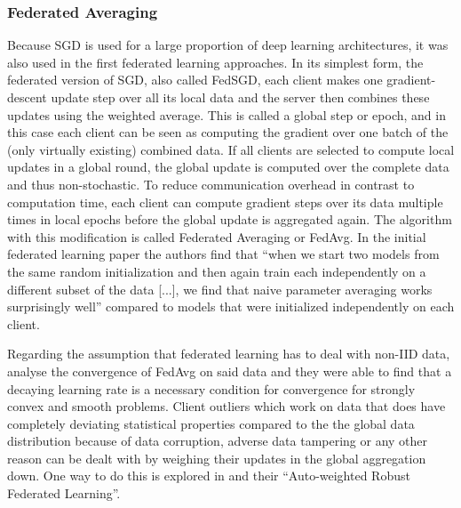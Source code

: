 \subsubsection{Federated Averaging}
Because SGD is used for a large proportion of deep learning architectures, it was also used in the first federated learning approaches. In its simplest form, the federated version of SGD, also called FedSGD, each client makes one gradient-descent update step over all its local data and the server then combines these updates using the weighted average. This is called a global step or epoch, and in this case each client can be seen as computing the gradient over one batch of the (only virtually existing) combined data. If all clients are selected to compute local updates in a global round, the global update is computed over the complete data and thus non-stochastic.
To reduce communication overhead in contrast to computation time, each client can compute gradient steps over its data multiple times in local epochs before the global update is aggregated again. The algorithm with this modification is called Federated Averaging or FedAvg. In the initial federated learning paper the authors find that \enquote{when we start two models from the same random initialization and then again train each independently on a different subset of the data [...], we find that naive parameter averaging works surprisingly well}\cite{fl_paper} compared to models that were initialized independently on each client.

Regarding the assumption that federated learning has to deal with non-IID data, \cite{fedavg_convergence} analyse the convergence of FedAvg on said data and they were able to find that a decaying learning rate is a necessary condition for convergence for strongly convex and smooth problems. Client outliers which work on data that does have completely deviating statistical properties compared to the the global data distribution because of data corruption, adverse data tampering or any other reason can be dealt with by weighing their updates in the global aggregation down. One way to do this is explored in \cite{robust_fl} and their \enquote{Auto-weighted Robust Federated Learning}.

